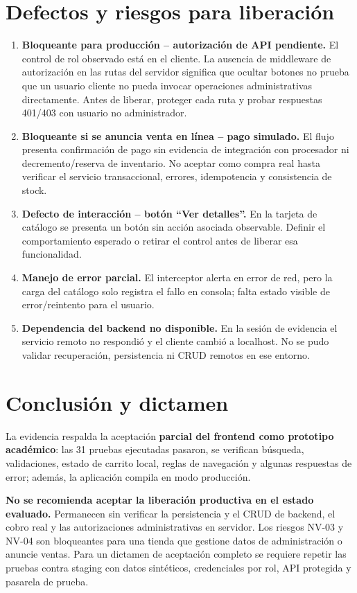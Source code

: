 \documentclass[11pt,letterpaper]{article}
\begin{document}
\section{Defectos y riesgos para liberación}
\begin{enumerate}[leftmargin=1.7em]
  \item \textbf{Bloqueante para producción -- autorización de API pendiente.} El control de rol
  observado está en el cliente. La ausencia de middleware de autorización en las rutas del
  servidor significa que ocultar botones no prueba que un usuario cliente no pueda invocar
  operaciones administrativas directamente. Antes de liberar, proteger cada ruta y probar
  respuestas 401/403 con usuario no administrador.
  \item \textbf{Bloqueante si se anuncia venta en línea -- pago simulado.} El flujo presenta
  confirmación de pago sin evidencia de integración con procesador ni decremento/reserva de
  inventario. No aceptar como compra real hasta verificar el servicio transaccional, errores,
  idempotencia y consistencia de stock.
  \item \textbf{Defecto de interacción -- botón ``Ver detalles''.} En la tarjeta de catálogo se
  presenta un botón sin acción asociada observable. Definir el comportamiento esperado o retirar
  el control antes de liberar esa funcionalidad.
  \item \textbf{Manejo de error parcial.} El interceptor alerta en error de red, pero la carga del
  catálogo solo registra el fallo en consola; falta estado visible de error/reintento para el
  usuario.
  \item \textbf{Dependencia del backend no disponible.} En la sesión de evidencia el servicio
  remoto no respondió y el cliente cambió a localhost. No se pudo validar recuperación,
  persistencia ni CRUD remotos en ese entorno.
\end{enumerate}

\section{Conclusión y dictamen}
La evidencia respalda la aceptación \textbf{parcial del frontend como prototipo académico}: las
31 pruebas ejecutadas pasaron, se verifican búsqueda, validaciones, estado de carrito local,
reglas de navegación y algunas respuestas de error; además, la aplicación compila en modo
producción.

\textbf{No se recomienda aceptar la liberación productiva en el estado evaluado.} Permanecen sin
verificar la persistencia y el CRUD de backend, el cobro real y las autorizaciones administrativas
en servidor. Los riesgos NV-03 y NV-04 son bloqueantes para una tienda que gestione datos de
administración o anuncie ventas. Para un dictamen de aceptación completo se requiere repetir las
pruebas contra staging con datos sintéticos, credenciales por rol, API protegida y pasarela de
prueba.
\end{document}

